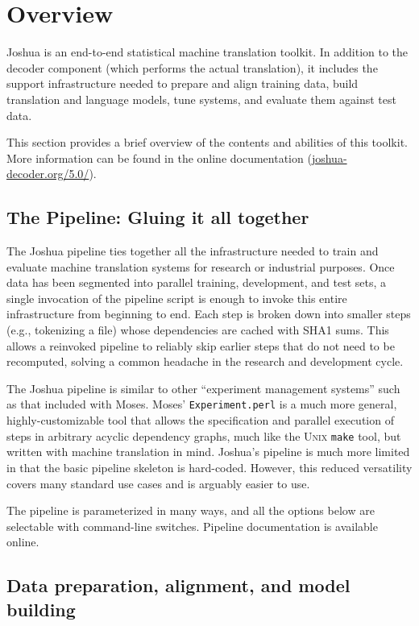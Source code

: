 \documentclass[11pt]{article}
\begin{document}
\section{Overview}

Joshua is an end-to-end statistical machine translation toolkit. In
addition to the decoder component (which performs the actual
translation), it includes the support infrastructure needed to prepare
and align training data, build translation and language models, tune
systems, and evaluate them against test data.

This section provides a brief overview of the contents and abilities
of this toolkit. More information can be found in the online
documentation (\url{joshua-decoder.org/5.0/}).

\subsection{The Pipeline: Gluing it all together}

The Joshua pipeline ties together all the infrastructure needed to
train and evaluate machine translation systems for research or
industrial purposes. Once data has been segmented into parallel
training, development, and test sets, a single invocation of the
pipeline script is enough to invoke this entire infrastructure from
beginning to end. Each step is broken down into smaller steps (e.g.,
tokenizing a file) whose dependencies are cached with SHA1 sums. This
allows a reinvoked pipeline to reliably skip earlier steps that do not
need to be recomputed, solving a common headache in the research and
development cycle.

The Joshua pipeline is similar to other ``experiment management
systems'' such as that included with Moses.  Moses'
\verb|Experiment.perl| is a much more general, highly-customizable
tool that allows the specification and parallel execution of steps in
arbitrary acyclic dependency graphs, much like the \textsc{Unix}
\verb|make| tool, but written with machine translation in
mind. Joshua's pipeline is much more limited in that the basic
pipeline skeleton is hard-coded. However, this reduced versatility
covers many standard use cases and is arguably easier to use.

The pipeline is parameterized in many ways, and all the options below
are selectable with command-line switches. Pipeline documentation is
available online.

\subsection{Data preparation, alignment, and model building}
\end{document}
